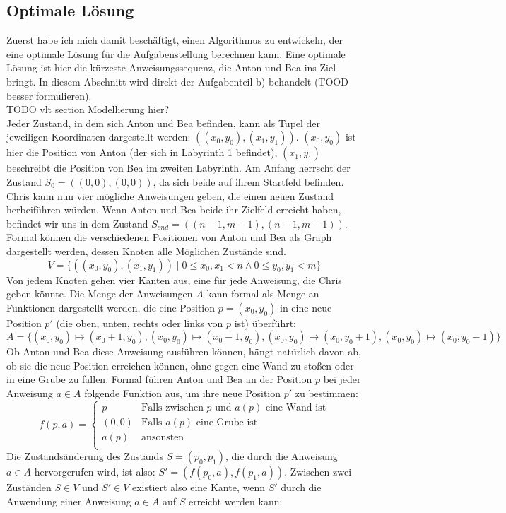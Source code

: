 \documentclass[a4paper,10pt,ngerman]{scrartcl}
\begin{document}
\subsection{Optimale Lösung}
Zuerst habe ich mich damit beschäftigt, einen Algorithmus zu entwickeln, der eine optimale Lösung für die Aufgabenstellung berechnen kann. Eine optimale Lösung ist hier die kürzeste Anweisungssequenz, die Anton und Bea ins Ziel bringt. In diesem Abschnitt wird direkt der Aufgabenteil b) behandelt (TOOD besser formulieren). \\
TODO vlt section Modellierung hier? \\
Jeder Zustand, in dem sich Anton und Bea befinden, kann als Tupel der jeweiligen Koordinaten dargestellt werden: $((x_0,y_0), (x_1, y_1))$.
$(x_0,y_0)$ ist hier die Position von Anton (der sich in Labyrinth 1 befindet), $(x_1, y_1)$ beschreibt die Position von Bea im zweiten Labyrinth.
Am Anfang herrscht der Zustand $S_0 = ((0,0), (0,0))$, da sich beide auf ihrem Startfeld befinden. Chris kann nun vier mögliche Anweisungen geben, die einen neuen Zustand herbeiführen würden. Wenn Anton und Bea beide ihr Zielfeld erreicht haben, befindet wir uns in dem Zustand $S_{end} = ((n-1, m-1), (n-1, m-1))$.\\
Formal können die verschiedenen Positionen von Anton und Bea als Graph dargestellt werden, dessen Knoten alle Möglichen Zustände sind.
\[ V = \{((x_0, y_0), (x_1, y_1)) \mid 0 \le x_0, x_1 < n \land 0 \le y_0, y_1 < m\}\]
Von jedem Knoten gehen vier Kanten aus, eine für jede Anweisung, die Chris geben könnte. Die Menge der Anweisungen $A$ kann formal als Menge an Funktionen dargestellt werden, die eine Position $p = (x_0, y_0)$ in eine neue Position $p'$ (die oben, unten, rechts oder links von $p$ ist) überführt: \[A = \{(x_0, y_0) \mapsto (x_0 + 1, y_0), (x_0, y_0) \mapsto (x_0 - 1, y_0), (x_0, y_0) \mapsto (x_0, y_0 + 1), (x_0, y_0) \mapsto (x_0, y_0 - 1)\}\]
Ob Anton und Bea diese Anweisung ausführen können, hängt natürlich davon ab, ob sie die neue Position erreichen können, ohne gegen eine Wand zu stoßen oder in eine Grube zu fallen. Formal führen Anton und Bea an der Position $p$ bei jeder Anweisung $a \in A$ folgende Funktion aus, um ihre neue Position $p'$ zu bestimmen:
\[f(p, a) =
\begin{cases}
p & \text{Falls zwischen $p$ und $a(p)$ eine Wand ist} \\
(0, 0)  & \text {Falls $a(p)$ eine Grube ist}\\
a(p) & \text{ansonsten} \\
\end{cases}\]
Die Zustandsänderung des Zustands $S = (p_0, p_1)$, die durch die Anweisung $a \in A$ hervorgerufen wird, ist also: $S' = (f(p_0, a), f(p_1, a))$. Zwischen zwei Zuständen $S \in V$ und $S' \in V$ existiert also eine Kante, wenn $S'$ durch die Anwendung einer Anweisung $a \in A$ auf $S$ erreicht werden kann:
\end{document}
